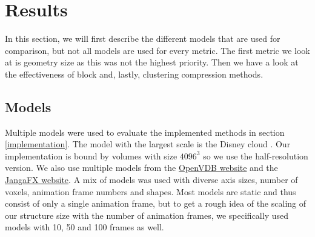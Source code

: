 \section{Results} \label{results}
In this section, we will first describe the different models that are used for comparison, but not all models are used for every metric. The first metric we look at is geometry size as this was not the highest priority. Then we have a look at the effectiveness of block and, lastly, clustering compression methods.


\subsection{Models} \label{results:models}
Multiple models were used to evaluate the implemented methods in section \ref{implementation}. The model with the largest scale is the Disney cloud \cite{DisneyCloud}. Our implementation is bound by volumes with size $4096^3$ so we use the half-resolution version. We also use multiple models from the \href{https://www.openvdb.org/download/}{OpenVDB website} and the \href{https://jangafx.com/software/embergen/download/free-vdb-animations/}{JangaFX website}. A mix of models was used with diverse axis sizes, number of voxels, animation frame numbers and shapes. Most models are static and thus consist of only a single animation frame, but to get a rough idea of the scaling of our structure size with the number of animation frames, we specifically used models with 10, 50 and 100 frames as well.

